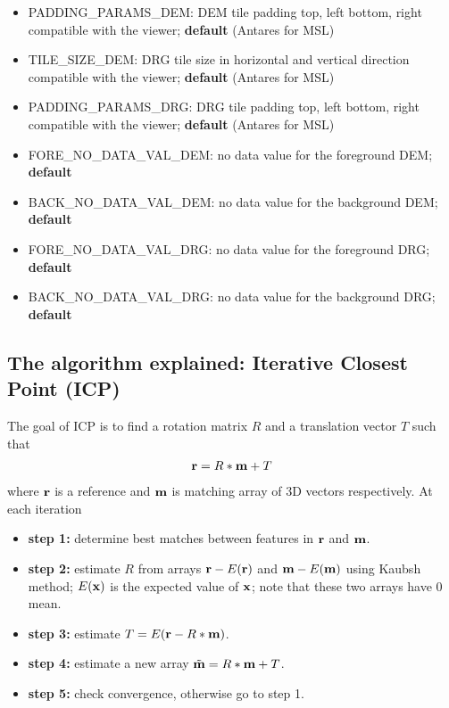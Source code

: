 \begin{itemize}
        \item{\textsc{PADDING\_PARAMS\_DEM}}: DEM tile padding top, left bottom, right compatible with the viewer; {\bf default} (Antares for MSL)
        \item{\textsc{TILE\_SIZE\_DEM}}: DRG tile size in horizontal and vertical direction compatible with the viewer; {\bf default} (Antares for MSL)
	\item{\textsc{PADDING\_PARAMS\_DRG}}: DRG tile padding top, left bottom, right compatible with the viewer; {\bf default} (Antares for MSL)
        \item{\textsc{FORE\_NO\_DATA\_VAL\_DEM}}: no data value for the foreground DEM; {\bf default}
        \item{\textsc{BACK\_NO\_DATA\_VAL\_DEM}}: no data value for the background DEM; {\bf default}
        \item{\textsc{FORE\_NO\_DATA\_VAL\_DRG}}: no data value for the foreground DRG; {\bf default}
        \item{\textsc{BACK\_NO\_DATA\_VAL\_DRG}}: no data value for the background DRG; {\bf default}

\end{itemize}


\subsection{The algorithm explained: Iterative Closest Point (ICP)}
The goal of ICP is to find a rotation matrix $R$ and a translation vector $T$ such that 
\begin{eqnarray}
{\bf r} = R*{\bf m}+T
\end{eqnarray}
where $\bf r$ is a reference and $\bf m$ is matching array of 3D vectors respectively.
At each iteration
\begin{itemize}
\item {\bf step 1:} determine best matches between features in $\bf r$ and $\bf m$.
\item {\bf step 2:} estimate $R$ from arrays ${\bf r} - E({\bf r})$ and ${\bf m}-E({\bf m})$ using Kaubsh method; $E({\bf x})$ is the expected value of $\bf x$;
                   note that these two arrays have 0 mean.
\item {\bf step 3:} estimate $T=E({\bf r}-R*{\bf m})$.
\item {\bf step 4:} estimate a new array $\tilde{\bf m} = R*{\bf m} + T$.
\item {\bf step 5:} check convergence, otherwise go to step 1.
\end{itemize}

